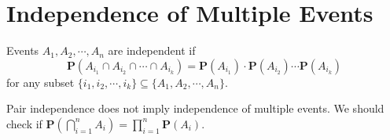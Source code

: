 \section{Independence of Multiple Events}
\begin{definition}
    Events $A_1, A_2, \cdots, A_n$ are independent if
    \begin{equation}
        \mathbf{P}(A_{i_1} \cap A_{i_2} \cap \cdots \cap A_{i_k}) = \mathbf{P}(A_{i_1}) \cdot \mathbf{P}(A_{i_2}) \cdots \mathbf{P}(A_{i_k})
    \end{equation}
    for any subset $\{i_1, i_2, \cdots, i_k\} \subseteq \{A_1, A_2, \cdots, A_n\}$.
\end{definition}
\begin{remark}
    Pair independence does not imply independence of multiple events. We should check if $\mathbf{P}(\bigcap_{i=1}^{n} A_i) = \prod_{i=1}^{n} \mathbf{P}(A_i)$.
\end{remark}
